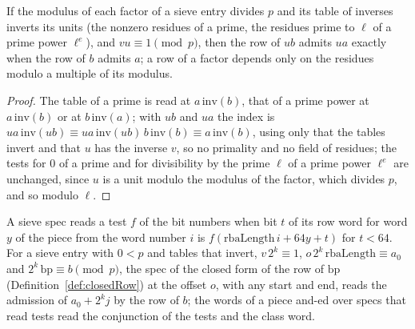 \begin{lemma}\label{lem:admits_mul}
  \leanok
  If the modulus of each factor of a sieve entry divides $p$ and its table of inverses inverts its
  units (the nonzero residues of a prime, the residues prime to $\ell$ of a prime power $\ell^e$),
  and $v u \equiv 1 \pmod p$, then the row of $u b$ admits $u a$ exactly when the row of $b$ admits
  $a$; a row of a factor depends only on the residues modulo a multiple of its modulus.
\end{lemma}

\begin{proof}
  \leanok
  The table of a prime is read at $a\, \mathrm{inv}(b)$, that of a prime power at $a\,
  \mathrm{inv}(b)$ or at $b\,\mathrm{inv}(a)$; with $u b$ and $u a$ the index is $u a\,
  \mathrm{inv}(u b) \equiv u a\, \mathrm{inv}(u b)\, b\, \mathrm{inv}(b) \equiv a\,
  \mathrm{inv}(b)$, using only that the tables invert and that $u$ has the inverse $v$, so no
  primality and no field of residues; the tests for $0$ of a prime and for divisibility by the prime
  $\ell$ of a prime power $\ell^e$ are unchanged, since $u$ is a unit modulo the modulus of the
  factor, which divides $p$, and so modulo $\ell$.
\end{proof}

\begin{lemma}\label{lem:reads_row}
  \leanok
  A sieve spec reads a test $f$ of the bit numbers when bit $t$ of its row word for word $y$ of the
  piece from the word number $i$ is $f(\mathrm{rbaLength}\, i + 64 y + t)$ for $t < 64$. For a sieve
  entry with $0 < p$ and tables that invert, $v\, 2^k \equiv 1$,
  $o\, 2^k\,\mathrm{rbaLength} \equiv a_0$ and $2^k\, \mathrm{bp} \equiv b \pmod p$, the spec of the
  closed form of the row of $\mathrm{bp}$ (Definition~\ref{def:closedRow}) at the offset $o$, with
  any start and end, reads the admission of $a_0 + 2^k j$ by the row of $b$; the words of a piece
  and-ed over specs that read tests read the conjunction of the tests and the class word.
\end{lemma}

